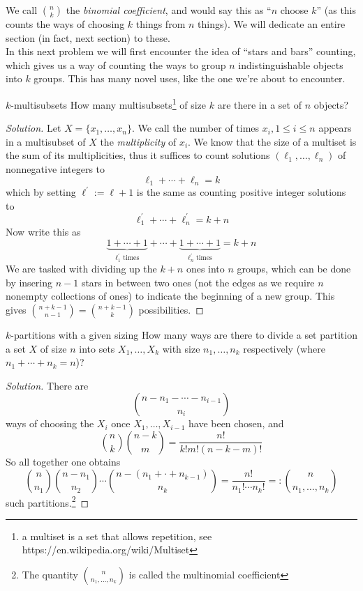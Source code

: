 \documentclass{article}
\begin{document}
We call $\binom{n}{k}$ the {\it binomial coefficient}, and would say this as ``$n$ choose $k$'' (as this counts the ways of 
choosing $k$ things from $n$ things). We will dedicate an entire section (in fact, next section) to these. \\ 

In this next problem we will first encounter the idea of ``stars and bars'' counting, which gives us a way of counting 
the ways to group $n$ indistinguishable objects into $k$ groups. This has many novel uses, like the one we're 
about to encounter. 

\begin{problem}[]{$k$-multisubsets}
    How many multisubsets\footnote{a multiset is a set that allows repetition, see https://en.wikipedia.org/wiki/Multiset} of size $k$ are there
    in a set of $n$ objects?
\end{problem}

\begin{proof}[Solution]
    Let $X = \{x_1, \dots, x_n\}$. We call the number of times $x_i, 1 \leq i \leq n$ appears in a multisubset of $X$ the {\it multiplicity} of $x_i$.
    We know that the size of a multiset is the sum of its multiplicities, thus it suffices to count solutions $(\ell_1, \dots, \ell_n)$ of 
    nonnegative integers to 
    \[\ell_1 + \cdots + \ell_n = k\] 
    which by setting $\ell^\prime := \ell + 1$ is the same as counting positive integer solutions to 
    \[\ell^\prime_1 + \cdots + \ell^\prime_n = k + n\] Now write this as \[\underbrace{1 + \cdots + 1}_{\ell_1^\prime \text{ times}} + 
    \cdots + \underbrace{1 + \cdots + 1}_{\ell_n^\prime \text{ times}} = k + n\]
    We are tasked with dividing up the $k + n$ ones into $n$ groups, which can be done by insering $n-1$ stars in between two ones (not the edges
    as we require $n$ nonempty collections of ones) to indicate the beginning of a new group. This gives $\binom{n+k-1}{n-1} = \binom{n+k-1}{k}$
    possibilities.
\end{proof}

\begin{problem}[]{$k$-partitions with a given sizing}
    How many ways are there to divide a set partition a set $X$ of size $n$ into sets $X_1, \dots, X_k$ with size $n_1, \dots, n_k$ respectively 
    (where $n_1 + \cdots + n_k = n$)?
\end{problem}

\begin{proof}[Solution]
    There are 
    \[\binom{n - n_1 - \cdots - n_{i-1}}{n_i}\]
    ways of choosing the $X_i$ once $X_1, \dots, X_{i-1}$ have been chosen, and 
    \[\binom{n}{k}\binom{n - k}{m} = \frac{n!}{k!m!(n-k-m)!}\] 
    So all together one obtains 
    \[\binom{n}{n_1}\binom{n-n_1}{n_2}\cdots\binom{n - (n_1 + \cdot + n_{k-1})}{n_k} = \frac{n!}{n_1!\cdots n_k!} =: \binom{n}{n_1, \dots, n_k}\]
    such partitions.\footnote{The quantity $\binom{n}{n_1, \dots, n_k}$ is called the multinomial coefficient}
\end{proof}
\end{document}
